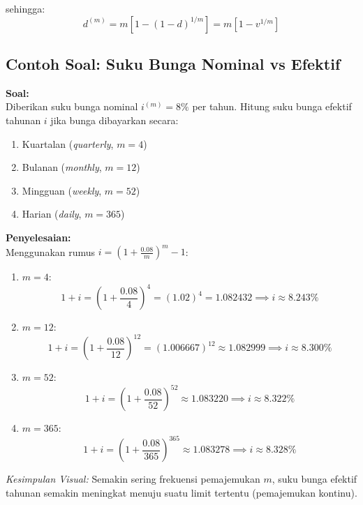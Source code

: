\documentclass[11pt,a4paper]{article}
\begin{document}
sehingga:
\begin{equation}
    d^{(m)} = m \left[ 1 - (1 - d)^{1/m} \right] = m \left[ 1 - v^{1/m} \right]
\end{equation}

\subsection{Contoh Soal: Suku Bunga Nominal vs Efektif}
\begin{examplebox}
\textbf{Soal:}\\
Diberikan suku bunga nominal $i^{(m)} = 8\%$ per tahun. Hitung suku bunga efektif tahunan $i$ jika bunga dibayarkan secara:
\begin{enumerate}[label=(\alph*)]
    \item Kuartalan (\textit{quarterly}, $m = 4$)
    \item Bulanan (\textit{monthly}, $m = 12$)
    \item Mingguan (\textit{weekly}, $m = 52$)
    \item Harian (\textit{daily}, $m = 365$)
\end{enumerate}

\vspace{0.5em}
\textbf{Penyelesaian:}\\
Menggunakan rumus $i = \left(1 + \frac{0.08}{m}\right)^m - 1$:
\begin{enumerate}[label=(\alph*)]
    \item $m = 4$:
    \begin{equation*}
        1 + i = \left(1 + \frac{0.08}{4}\right)^4 = (1.02)^4 = 1.082432 \implies i \approx 8.243\%
    \end{equation*}
    \item $m = 12$:
    \begin{equation*}
        1 + i = \left(1 + \frac{0.08}{12}\right)^{12} = (1.006667)^{12} \approx 1.082999 \implies i \approx 8.300\%
    \end{equation*}
    \item $m = 52$:
    \begin{equation*}
        1 + i = \left(1 + \frac{0.08}{52}\right)^{52} \approx 1.083220 \implies i \approx 8.322\%
    \end{equation*}
    \item $m = 365$:
    \begin{equation*}
        1 + i = \left(1 + \frac{0.08}{365}\right)^{365} \approx 1.083278 \implies i \approx 8.328\%
    \end{equation*}
\end{enumerate}
\textit{Kesimpulan Visual:} Semakin sering frekuensi pemajemukan $m$, suku bunga efektif tahunan semakin meningkat menuju suatu limit tertentu (pemajemukan kontinu).
\end{examplebox}
\end{document}
